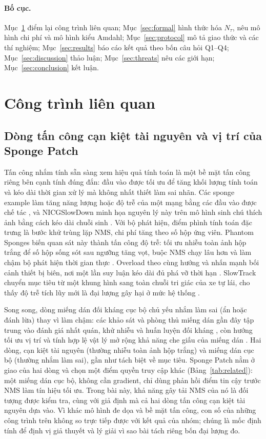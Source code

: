 \documentclass[12pt,a4paper]{article}
\newcommand{\Ntau}{N_{\tau}}
\begin{document}
\paragraph{Bố cục.}
Mục~\ref{sec:related} điểm lại công trình liên quan; Mục~\ref{sec:formal} hình thức hóa $\Ntau$, nêu mô hình chi phí và mô hình kiểu Amdahl; Mục~\ref{sec:protocol} mô tả giao thức và các thí nghiệm; Mục~\ref{sec:results} báo cáo kết quả theo bốn câu hỏi Q1--Q4; Mục~\ref{sec:discussion} thảo luận; Mục~\ref{sec:threats} nêu các giới hạn; Mục~\ref{sec:conclusion} kết luận.

\section{Công trình liên quan}
\label{sec:related}
\subsection{Dòng tấn công cạn kiệt tài nguyên và vị trí của Sponge Patch}
Tấn công nhắm tính sẵn sàng xem hiệu quả tính toán là một bề mặt tấn công riêng bên cạnh tính đúng đắn: đầu vào được tối ưu để tăng khối lượng tính toán và kéo dài thời gian xử lý mà không nhất thiết làm sai nhãn. Các sponge example làm tăng năng lượng hoặc độ trễ của một mạng bằng các đầu vào được chế tác \cite{shumailov2021sponge}, và NICGSlowDown minh họa nguyên lý này trên mô hình sinh chú thích ảnh bằng cách kéo dài chuỗi sinh \cite{nicgslowdown2022}. Với bộ phát hiện, điểm phình tính toán đặc trưng là bước khử trùng lặp NMS, chi phí tăng theo số hộp ứng viên. Phantom Sponges biến quan sát này thành tấn công độ trễ: tối ưu nhiễu toàn ảnh hộp trắng để số hộp sống sót sau ngưỡng tăng vọt, buộc NMS chạy lâu hơn và làm chậm bộ phát hiện thời gian thực \cite{phantom2023}. Overload theo cùng hướng và nhấn mạnh bối cảnh thiết bị biên, nơi một lần suy luận kéo dài đủ phá vỡ thời hạn \cite{overload2024}. SlowTrack chuyển mục tiêu từ một khung hình sang toàn chuỗi tri giác của xe tự lái, cho thấy độ trễ tích lũy mới là đại lượng gây hại ở mức hệ thống \cite{slowtrack2024}.

Song song, dòng miếng dán đối kháng cục bộ chủ yếu nhắm làm sai (ẩn hoặc đánh lừa) thay vì làm chậm: các khảo sát và phòng thủ miếng dán gần đây tập trung vào đánh giá nhất quán, khử nhiễu và huấn luyện đối kháng \cite{apde2025,pbcat2025}, còn hướng tối ưu vị trí và tính hợp lệ vật lý mở rộng khả năng che giấu của miếng dán \cite{iap2025}. Hai dòng, cạn kiệt tài nguyên (thường nhiễu toàn ảnh hộp trắng) và miếng dán cục bộ (thường nhắm làm sai), gần như tách biệt về mục tiêu. Sponge Patch nằm ở giao của hai dòng và chọn một điểm quyền truy cập khác (Bảng~\ref{tab:related}): một miếng dán cục bộ, không cần gradient, chỉ dùng phản hồi điểm tin cậy trước NMS làm tín hiệu tối ưu. Trong bài này, khả năng gây tải NMS của nó là đối tượng được kiểm tra, cùng với giả định mà cả hai dòng tấn công cạn kiệt tài nguyên dựa vào. Vì khác mô hình đe dọa và bề mặt tấn công, con số của những công trình trên không so trực tiếp được với kết quả của nhóm; chúng là mốc định tính để định vị giả thuyết và lý giải vì sao bài tách riêng bốn đại lượng đo.
\end{document}
